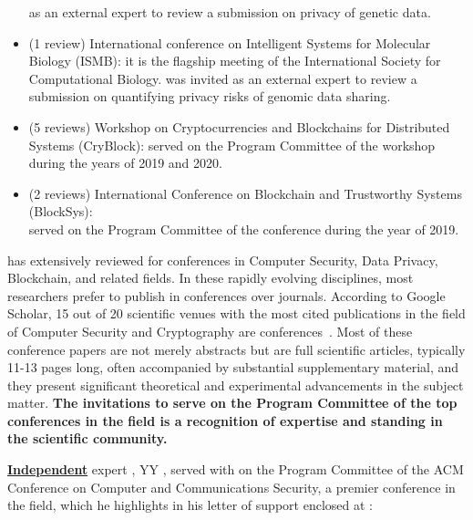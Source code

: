 \begin{itemize}
	as an external expert to review a submission on privacy of genetic data.
	\item (1 review) International conference on Intelligent Systems for
	Molecular Biology (ISMB): it is the flagship meeting of the International
	Society for Computational Biology. \dr was invited as an external expert to review a submission on quantifying privacy risks of genomic data sharing.
	\item (5 reviews) Workshop on Cryptocurrencies and Blockchains for 
	Distributed Systems (CryBlock): \dr served on the Program Committee of the 
	workshop during the years of 2019 and 2020.
	\item (2 reviews) International Conference on Blockchain and Trustworthy 
	Systems (BlockSys):\\ \dr served on the Program Committee of the 
	conference during the year of 2019.
\end{itemize}

\dr has extensively reviewed for conferences in Computer Security, Data Privacy,
Blockchain, and related fields.
In these rapidly evolving disciplines, most researchers prefer to publish in
conferences over journals.
According to Google Scholar, 15 out of 20 scientific venues with the most cited 
publications in the field of Computer Security and Cryptography are conferences~\cite{venues}.
Most of these conference papers are not merely abstracts but are 
full scientific articles, typically 11-13 pages long, often accompanied by 
substantial supplementary material, and they present significant theoretical 
and experimental advancements in the subject matter.
\textbf{The invitations to serve on the Program Committee of the
top conferences in the field is a recognition of \drs expertise and standing in
the scientific community.}

\textbf{\uline{Independent}} expert \ccc, YY \blueuni, served with \dr on the Program Committee of the ACM Conference on
Computer and Communications Security, a premier conference in the field, which he highlights in his letter of support enclosed at
:

